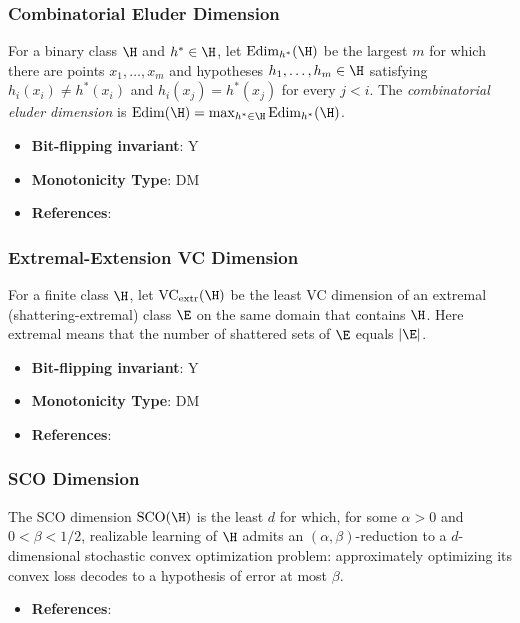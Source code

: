 \subsubsection{Combinatorial Eluder Dimension}
      \begin{definition}\label{def:combinatorial_eluder_dimension}
      For a binary class $\H$ and $h^*\in\H$, let $\mathrm{Edim}_{h^*}(\H)$ be the largest $m$ for which there are points $x_1,\ldots,x_m$ and hypotheses $h_1,\ldots,h_m\in\H$ satisfying $h_i(x_i)\ne h^*(x_i)$ and $h_i(x_j)=h^*(x_j)$ for every $j<i$.  The \emph{combinatorial eluder dimension} is $\mathrm{Edim}(\H)=\max_{h^*\in\H}\mathrm{Edim}_{h^*}(\H)$.
      \end{definition}
      \begin{itemize}
      \item {\bf Bit-flipping invariant}: Y
      \item {\bf Monotonicity Type}: DM
      \item {\bf References}: \cite{russo2013eluder,li2022understanding}
      \end{itemize}
\subsubsection{Extremal-Extension VC Dimension}
      \begin{definition}\label{def:extremal_extension_vc_dimension}
      For a finite class $\H$, let $\mathrm{VC}_{\mathrm{extr}}(\H)$ be the least VC dimension of an extremal (shattering-extremal) class $\E$ on the same domain that contains $\H$.  Here extremal means that the number of shattered sets of $\E$ equals $|\E|$.
      \end{definition}
      \begin{itemize}
      \item {\bf Bit-flipping invariant}: Y
      \item {\bf Monotonicity Type}: DM
      \item {\bf References}: \cite{chornomaz2025spherical}
      \end{itemize}
\subsubsection{SCO Dimension}
      \begin{definition}\label{def:sco_dimension}
      The SCO dimension $\mathrm{SCO}(\H)$ is the least $d$ for which, for some $\alpha>0$ and $0<\beta<1/2$, realizable learning of $\H$ admits an $(\alpha,\beta)$-reduction to a $d$-dimensional stochastic convex optimization problem: approximately optimizing its convex loss decodes to a hypothesis of error at most $\beta$.
      \end{definition}
      \begin{itemize}
      \item {\bf References}: \cite{chornomaz2025spherical}
      \end{itemize}
